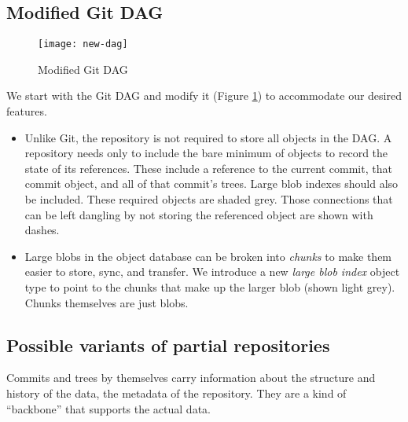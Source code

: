 \documentclass[a4paper]{article}
\newcommand{\newterm}{\textit}
\begin{document}
\subsection{Modified Git DAG}

\begin{figure}[h!]
    \caption{Modified Git DAG}
    \label{fig:new-dag}
    \centering
        \texttt{[image: new-dag]}
\end{figure}

We start with the Git DAG and modify it (Figure \ref{fig:new-dag}) to
accommodate our desired features.

\begin{itemize}
    \item
        Unlike Git, the repository is not required to store all objects in the
        DAG. A repository needs only to include the bare minimum of objects to
        record the state of its references. These include a reference to the
        current commit, that commit object, and all of that commit's trees.
        Large blob indexes should also be included. These required objects are
        shaded grey. Those connections that can be left dangling by not storing
        the referenced object are shown with dashes.
    \item
        Large blobs in the object database can be broken into \newterm{chunks}
        to make them easier to store, sync, and transfer. We introduce a new
        \newterm{large blob index} object type to point to the chunks that make
        up the larger blob (shown light grey). Chunks themselves are just blobs.
\end{itemize}


\subsection{Possible variants of partial repositories}

Commits and trees by themselves carry information about the structure and
history of the data, the metadata of the repository. They are a kind of
``backbone'' that supports the actual data.
\end{document}
